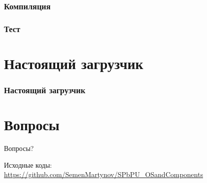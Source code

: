 \documentclass{beamer}
\begin{document}

\begin{frame}
\frametitle{Компиляция}



\end{frame}


\begin{frame}
\frametitle{Тест}



\end{frame}

\section{Настоящий загрузчик}

\begin{frame}
\frametitle{Настоящий загрузчик}



\end{frame}

\section{Вопросы}

\begin{frame}
\begin{minipage}[t][.8\textheight]{\textwidth}
	\vspace{5em}
    {\Huge{\centerline{Вопросы?}}}

    \vfill

    Исходные коды:\\ \url{https://github.com/SemenMartynov/SPbPU_OSandComponents}
\end{minipage}
\end{frame}

\end{document}
